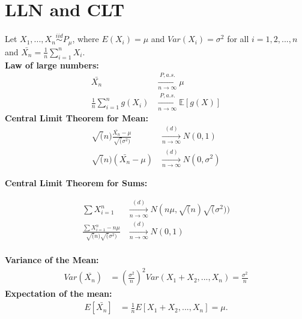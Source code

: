 \section{LLN and CLT}
Let $X_1, ..., X_n \stackrel{iid}{\sim} P_{\mu}$, where $E(X_i)=\mu$ and $Var(X_i)=\sigma^2$ for all $i=1,2,...,n$ and $\bar{X_n}= \frac{1}{n} \sum_{i=1}^{n} X_i$.\\
\textbf{Law of large numbers:}
\begin{align*}
\bar{X_n}& \xrightarrow[n \rightarrow \infty]{P, a.s.} \mu\\
\frac{1}{n} \sum_{i=1}^{n} g(X_i)& \xrightarrow[n \rightarrow \infty]{P, a.s.} \mathbb{E}[g(X)]
\end{align*}
\textbf{Central Limit Theorem for Mean:}
\begin{align*}
\sqrt(n)\frac{\bar{X_n}-\mu}{\sqrt(\sigma^2)}& \xrightarrow[n \rightarrow \infty]{(d)} N(0,1)\\
\sqrt(n)(\bar{X_n}-\mu)& \xrightarrow[n \rightarrow \infty]{(d)} N(0,\sigma^2)
\end{align*}

\textbf{Central Limit Theorem for Sums:}

\begin{align*}
\sum{X}_{i=1}^{n} & \xrightarrow[n \rightarrow \infty]{(d)} N(n \mu, \sqrt(n)\sqrt(\sigma^2))\\
\frac{\sum{X}_{i=1}^{n} - n\mu}{\sqrt(n) \sqrt(\sigma^2)} & \xrightarrow[n \rightarrow \infty]{(d)} N(0, 1)\\
\end{align*}

\textbf{Variance of the Mean:}
\begin{align*}
Var(\overline{X_n})&=(\frac{\sigma^2}{n})^2 Var(X_1 + X_2,...,X_n) =\frac{\sigma^2}{n}
\end{align*}
\textbf{Expectation of the mean:}
\begin{align*}
E[\bar{X_n}] & =\frac{1}{n}E[X_1 + X_2,...,X_n] =\mu.
\end{align*}